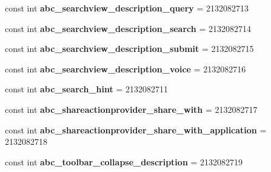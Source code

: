 \begin{DoxyCompactItemize}
\item 
\mbox{\label{classst_delivery_1_1_resource_1_1_string_aca02a0eabfdde1d9910dcfb8c152cc04}} 
const int {\bfseries abc\+\_\+searchview\+\_\+description\+\_\+query} = 2132082713
\item 
\mbox{\label{classst_delivery_1_1_resource_1_1_string_ac4c95358c4c81e5218a68314b2906f41}} 
const int {\bfseries abc\+\_\+searchview\+\_\+description\+\_\+search} = 2132082714
\item 
\mbox{\label{classst_delivery_1_1_resource_1_1_string_a8977d3c00f3865a04a5b9bb2abefe0de}} 
const int {\bfseries abc\+\_\+searchview\+\_\+description\+\_\+submit} = 2132082715
\item 
\mbox{\label{classst_delivery_1_1_resource_1_1_string_a5c04719b8b29b2128dd880efb25f6a4c}} 
const int {\bfseries abc\+\_\+searchview\+\_\+description\+\_\+voice} = 2132082716
\item 
\mbox{\label{classst_delivery_1_1_resource_1_1_string_ae56f588a0445a52d2e6d82f0df4d8adc}} 
const int {\bfseries abc\+\_\+search\+\_\+hint} = 2132082711
\item 
\mbox{\label{classst_delivery_1_1_resource_1_1_string_a9e8c28755e6fdd75a93890ac104e5d5a}} 
const int {\bfseries abc\+\_\+shareactionprovider\+\_\+share\+\_\+with} = 2132082717
\item 
\mbox{\label{classst_delivery_1_1_resource_1_1_string_a379ce81e1bfcffe8abeb9d6249803c96}} 
const int {\bfseries abc\+\_\+shareactionprovider\+\_\+share\+\_\+with\+\_\+application} = 2132082718
\item 
\mbox{\label{classst_delivery_1_1_resource_1_1_string_ac0c1be3ea744446d889e5f7165c09f71}} 
const int {\bfseries abc\+\_\+toolbar\+\_\+collapse\+\_\+description} = 2132082719
\item 
\mbox{\label{classst_delivery_1_1_resource_1_1_string_a3b4ceff10112984cbb1bcccbc8f6d72a}} 

\end{DoxyCompactItemize}
